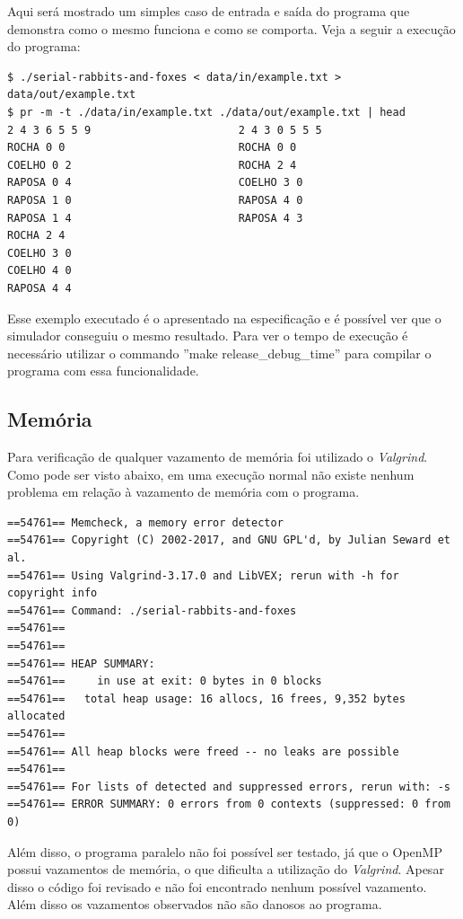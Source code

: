 \documentclass[12pt]{article}
\begin{document}
Aqui será mostrado um simples caso de entrada e saída do programa que demonstra como o mesmo funciona e como se comporta. Veja a seguir a execução do programa:

\begin{verbatim}
$ ./serial-rabbits-and-foxes < data/in/example.txt > data/out/example.txt 
$ pr -m -t ./data/in/example.txt ./data/out/example.txt | head            
2 4 3 6 5 5 9                       2 4 3 0 5 5 5
ROCHA 0 0                           ROCHA 0 0
COELHO 0 2                          ROCHA 2 4
RAPOSA 0 4                          COELHO 3 0
RAPOSA 1 0                          RAPOSA 4 0
RAPOSA 1 4                          RAPOSA 4 3
ROCHA 2 4                           
COELHO 3 0                          
COELHO 4 0                          
RAPOSA 4 4                      
\end{verbatim}


Esse exemplo executado é o apresentado na especificação e é possível ver que o simulador conseguiu o mesmo resultado. Para ver o tempo de execução é necessário utilizar o commando ''make release\_debug\_time'' para compilar o programa com essa funcionalidade.

\subsection{Memória}

Para verificação de qualquer vazamento de memória foi utilizado o \textit{Valgrind}. Como pode ser visto abaixo, em uma execução normal não existe nenhum problema em relação à vazamento de memória com o programa.

	{
		\scriptsize
		\begin{verbatim}
==54761== Memcheck, a memory error detector
==54761== Copyright (C) 2002-2017, and GNU GPL'd, by Julian Seward et al.
==54761== Using Valgrind-3.17.0 and LibVEX; rerun with -h for copyright info
==54761== Command: ./serial-rabbits-and-foxes
==54761== 
==54761== 
==54761== HEAP SUMMARY:
==54761==     in use at exit: 0 bytes in 0 blocks
==54761==   total heap usage: 16 allocs, 16 frees, 9,352 bytes allocated
==54761== 
==54761== All heap blocks were freed -- no leaks are possible
==54761== 
==54761== For lists of detected and suppressed errors, rerun with: -s
==54761== ERROR SUMMARY: 0 errors from 0 contexts (suppressed: 0 from 0)
\end{verbatim}
	}

Além disso, o programa paralelo não foi possível ser testado, já que o OpenMP possui vazamentos de memória, o que dificulta a utilização do \textit{Valgrind}. Apesar disso o código foi revisado e não foi encontrado nenhum possível vazamento. Além disso os vazamentos observados não são danosos ao programa.
\end{document}
